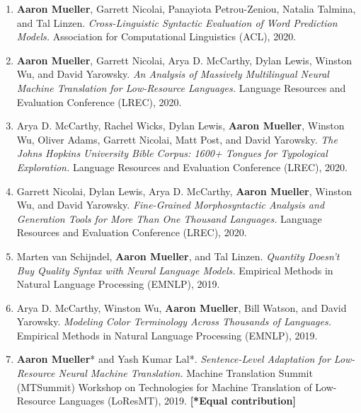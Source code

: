 \documentclass[10pt]{article}
\begin{document}
	\begin{enumerate}[leftmargin=*, topsep=0pt, itemsep=-1ex, partopsep=0ex, parsep=1ex]

	\item \textbf{Aaron Mueller}, Garrett Nicolai, Panayiota Petrou-Zeniou, Natalia Talmina, and Tal Linzen. \emph{Cross-Linguistic Syntactic Evaluation of Word Prediction Models.} Association for Computational Linguistics (ACL), 2020.

	\item \textbf{Aaron Mueller}, Garrett Nicolai, Arya D. McCarthy, Dylan Lewis, Winston Wu, and David Yarowsky. \emph{An Analysis of Massively Multilingual Neural Machine Translation for Low-Resource Languages.} Language Resources and Evaluation Conference (LREC), 2020.

	\item Arya D. McCarthy, Rachel Wicks, Dylan Lewis, \textbf{Aaron Mueller}, Winston Wu, Oliver Adams, Garrett Nicolai, Matt Post, and David Yarowsky. \emph{The Johns Hopkins University Bible Corpus: 1600+ Tongues for Typological Exploration.} Language Resources and Evaluation Conference (LREC), 2020.

	\item Garrett Nicolai, Dylan Lewis, Arya D. McCarthy, \textbf{Aaron Mueller}, Winston Wu, and David Yarowsky. \emph{Fine-Grained Morphosyntactic Analysis and Generation Tools for More Than One Thousand Languages.} Language Resources and Evaluation Conference (LREC), 2020.

	\item Marten van Schijndel, \textbf{Aaron Mueller}, and Tal Linzen. \emph{Quantity Doesn't Buy Quality Syntax with Neural Language Models.} Empirical Methods in Natural Language Processing (EMNLP), 2019.

	\item Arya D. McCarthy, Winston Wu, \textbf{Aaron Mueller}, Bill Watson, and David Yarowsky. \emph{Modeling Color Terminology Across Thousands of Languages.} Empirical Methods in Natural Language Processing (EMNLP), 2019.

	\item \textbf{Aaron Mueller}* and Yash Kumar Lal*. \emph{Sentence-Level Adaptation for Low-Resource Neural Machine Translation.} Machine Translation Summit (MTSummit) Workshop on Technologies for Machine Translation of Low-Resource Languages (LoResMT), 2019. \textbf{[*Equal contribution]}

	\end{enumerate}
\end{document}
